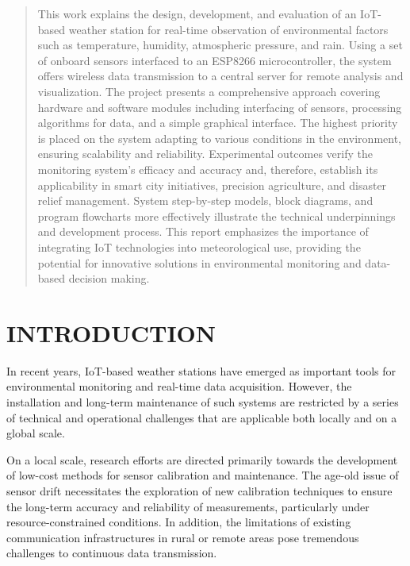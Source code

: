 \documentclass[conference, onecolumn]{IEEEtran}
\begin{document}
\begin{titlepage}
\begin{abstract}
This work explains the design, development, and evaluation of an IoT-based weather station for real-time observation of environmental factors such as temperature, humidity, atmospheric pressure, and rain. Using a set of onboard sensors interfaced to an ESP8266 microcontroller, the system offers wireless data transmission to a central server for remote analysis and visualization. The project presents a comprehensive approach covering hardware and
software modules including interfacing of sensors, processing algorithms for data, and a simple graphical interface. The highest priority is placed on the system adapting to various conditions in the environment, ensuring scalability and reliability. Experimental outcomes verify the monitoring system's efficacy and accuracy and, therefore, establish its applicability in smart city initiatives, precision agriculture, and disaster relief management. System step-by-step models, block diagrams, and program flowcharts
more effectively illustrate the technical underpinnings and development process. This report emphasizes the importance of integrating IoT technologies into meteorological use, providing the potential for innovative solutions in environmental monitoring and data-based decision making.

\end{abstract}

\end{titlepage}

\newpage
\tableofcontents
\newpage
    

\section{INTRODUCTION}
In recent years, IoT-based weather stations have emerged as important tools for environmental monitoring and real-time data acquisition. However, the installation and long-term maintenance of such systems are restricted by a series of technical and operational challenges that are applicable both locally and on a global scale.

On a local scale, research efforts are directed primarily towards the development of low-cost methods for sensor calibration and maintenance. The age-old issue of sensor drift necessitates the exploration of new calibration techniques to ensure the long-term accuracy and reliability of measurements, particularly under resource-constrained conditions. In addition, the limitations of existing communication infrastructures in rural or remote areas pose tremendous challenges to continuous data transmission.
\end{document}
